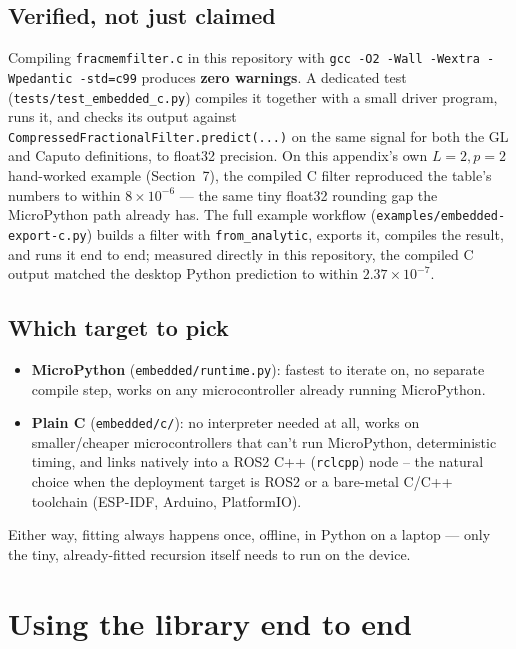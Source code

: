 \documentclass[11pt]{article}
\begin{document}
\subsection{Verified, not just claimed}
Compiling \texttt{fracmemfilter.c} in this repository with \texttt{gcc -O2 -Wall -Wextra -Wpedantic -std=c99} produces \textbf{zero warnings}. A dedicated test (\texttt{tests/test\_embedded\_c.py}) compiles it together with a small driver program, runs it, and checks its output against \texttt{CompressedFractionalFilter.predict(...)} on the same signal for both the GL and Caputo definitions, to float32 precision. On this appendix's own $L{=}2,p{=}2$ hand-worked example (Section~7), the compiled C filter reproduced the table's numbers to within $8\times10^{-6}$ --- the same tiny float32 rounding gap the MicroPython path already has. The full example workflow (\texttt{examples/embedded-export-c.py}) builds a filter with \texttt{from\_analytic}, exports it, compiles the result, and runs it end to end; measured directly in this repository, the compiled C output matched the desktop Python prediction to within $2.37\times10^{-7}$.

\subsection{Which target to pick}
\begin{itemize}
\item \textbf{MicroPython} (\texttt{embedded/runtime.py}): fastest to iterate on, no separate compile step, works on any microcontroller already running MicroPython.
\item \textbf{Plain C} (\texttt{embedded/c/}): no interpreter needed at all, works on smaller/cheaper microcontrollers that can't run MicroPython, deterministic timing, and links natively into a ROS2 C++ (\texttt{rclcpp}) node -- the natural choice when the deployment target is ROS2 or a bare-metal C/C++ toolchain (ESP-IDF, Arduino, PlatformIO).
\end{itemize}
Either way, fitting always happens once, offline, in Python on a laptop --- only the tiny, already-fitted recursion itself needs to run on the device.

\section{Using the library end to end}
\end{document}
